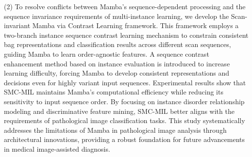 \begin{eabstract}
(2) To resolve conflicts between Mamba's sequence-dependent processing and the sequence invariance requirements of multi-instance learning, we develop the Scan-invariant Mamba via Contrast Learning framework. This framework employs a two-branch instance sequence contrast learning mechanism to constrain consistent bag representations and classification results across different scan sequences, guiding Mamba to learn order-agnostic features. A sequence contrast enhancement method based on instance evaluation is introduced to increase learning difficulty, forcing Mamba to develop consistent representations and decisions even for highly variant input sequences. Experimental results show that SMC-MIL maintains Mamba's computational efficiency while reducing its sensitivity to input sequence order. By focusing on instance disorder relationship modeling and discriminative feature mining, SMC-MIL better aligns with the requirements of pathological image classification tasks.
This study systematically addresses the limitations of Mamba in pathological image analysis through architectural innovations, providing a robust foundation for future advancements in medical image-assisted diagnosis.

\end{eabstract}

